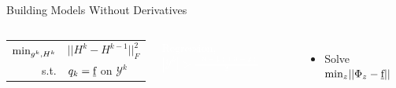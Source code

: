 \documentclass[handout,aspectratio=54]{beamer}
\numberwithin{theorem}{section}
\begin{document}
\begin{frame}{Building Models Without Derivatives}
\begin{columns}
\begin{itemize}
\begin{tabular}{rl}
$\textup{min}_{g^k, H^k}$ & $||H^k-H^{k-1}||^2_F$\\
s.t. & $q_k=\underline{\textup{f}}$ on $\mathcal{Y}^k$
\end{tabular}

\end{itemize}

\colorbox[rgb]{0.5,0.6,0.7}{\textcolor{white}{Regression, $|\mathcal{Y}^k|>\frac{(n+1)(n+2)}{2}$}}
\begin{itemize}\footnotesize
\item Solve $\textup{min}_z||\Phi_z-\underline{\textup{f}}||$
\end{itemize}
\end{columns}
\end{frame}
\end{document}

